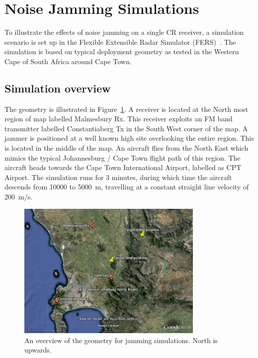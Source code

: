 \documentclass[english, 12pt]{report}
\begin{document}
\section{Noise Jamming Simulations}

To illustrate the effects of noise jamming on a single CR receiver, a simulation scenario is set up in the Flexible Extensible Radar Simulator (FERS)~\cite{Brooker_FERS:2011,FERS:2013}. The simulation is based on typical deployment geometry as tested in the Western Cape of South Africa around Cape Town. 

\subsection{Simulation overview}
The geometry is illustrated in Figure~\ref{fig:SimGeometryGE}. A receiver is located at the North most region of map labelled Malmesbury Rx. This receiver exploits an FM band transmitter labelled Constantiaberg Tx in the South West corner of the map. A jammer is positioned at a well known high site overlooking the entire region. This is located in the middle of the map. An aircraft flies from the North East which mimics the typical Johannesburg / Cape Town flight path of this region. The aircraft heads towards the Cape Town International Airport, labelled as CPT Airport. The simulation runs for 3 minutes, during which time the aircraft descends from 10000 to 5000~m, travelling at a constant straight line velocity of 200~m/s. 

\begin{figure}[htbp]
\begin{center}
\includegraphics[width=0.8\textwidth]{figs/Simulations/GEGeometryOverview.png}
\caption{An overview of the geometry for jamming simulations. North is upwards.}
\label{fig:SimGeometryGE}
\end{center}
\end{figure}
\end{document}

